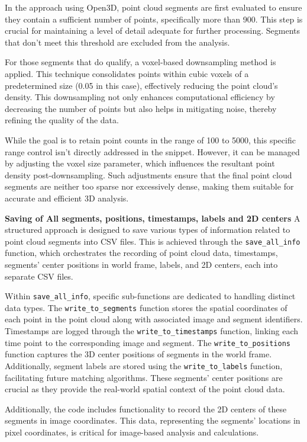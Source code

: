 In the approach using Open3D, point cloud segments are first evaluated to ensure they contain a sufficient number of points, specifically more than 900. This step is crucial for maintaining a level of detail adequate for further processing. Segments that don't meet this threshold are excluded from the analysis. 

For those segments that do qualify, a voxel-based downsampling method is applied. This technique consolidates points within cubic voxels of a predetermined size (0.05 in this case), effectively reducing the point cloud's density. This downsampling not only enhances computational efficiency by decreasing the number of points but also helps in mitigating noise, thereby refining the quality of the data. 

While the goal is to retain point counts in the range of 100 to 5000, this specific range control isn't directly addressed in the snippet. However, it can be managed by adjusting the voxel size parameter, which influences the resultant point density post-downsampling. Such adjustments ensure that the final point cloud segments are neither too sparse nor excessively dense, making them suitable for accurate and efficient 3D analysis.

\textbf{Saving of All segments, positions, timestamps, labels and 2D centers} A structured approach is designed to save various types of information related to point cloud segments into CSV files. This is achieved through the \texttt{save\_all\_info} function, which orchestrates the recording of point cloud data, timestamps, segments' center positions in world frame, labels, and 2D centers, each into separate CSV files.

Within \texttt{save\_all\_info}, specific sub-functions are dedicated to handling distinct data types. The \texttt{write\_to\_segments} function stores the spatial coordinates of each point in the point cloud along with associated image and segment identifiers. Timestamps are logged through the \texttt{write\_to\_timestamps} function, linking each time point to the corresponding image and segment. The \texttt{write\_to\_positions} function captures the 3D center positions of segments in the world frame. Additionally, segment labels are stored using the \texttt{write\_to\_labels} function, facilitating future matching algorithms. These segments' center positions are crucial as they provide the real-world spatial context of the point cloud data.

Additionally, the code includes functionality to record the 2D centers of these segments in image coordinates. This data, representing the segments' locations in pixel coordinates, is critical for image-based analysis and calculations.

